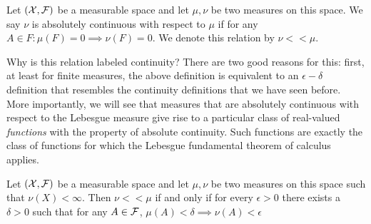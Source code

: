 \begin{defn}
\label{def:absoluteContinuityMeasures}Let $(\mathcal{X},\mathcal{F})$ be a measurable
space and let $\mu,\nu$ be two measures on this space. We say $\nu$
is absolutely continuous with respect to $\mu$ if for any $A\in F:\mu(F)=0\implies\nu(F)=0$.
We denote this relation by $\nu<<\mu$.

Why is this relation labeled continuity? There are two good reasons
for this: first, at least for finite measures, the above definition
is equivalent to an $\epsilon-\delta$ definition that resembles the
continuity definitions that we have seen before. More importantly,
we will see that measures that are absolutely continuous with respect
to the Lebesgue measure give rise to a particular class of real-valued
\emph{functions }with the property of absolute continuity. Such functions
are exactly the class of functions for which the Lebesgue fundamental
theorem of calculus applies.
\end{defn}

\begin{prop}
\label{prop:epsdeltaAbsContinuity}Let $(\mathcal{X},\mathcal{F})$ be a measurable
space and let $\mu,\nu$ be two measures on this space such that $\nu(X)<\infty$.
Then $\nu<<\mu$ if and only if for every $\epsilon>0$ there exists
a $\delta>0$ such that for any $A\in\mathcal{F}$, $\mu(A)<\delta\implies\nu(A)<\epsilon$
\end{prop}

